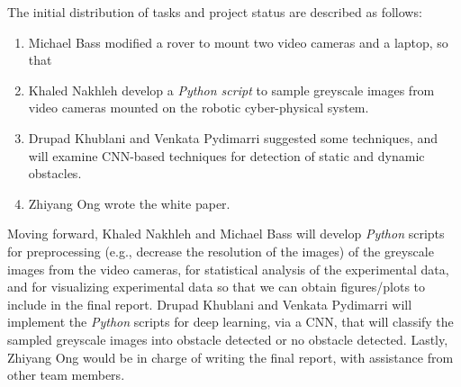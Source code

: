 \documentclass[letter,12pt]{article}
\begin{document}
The initial distribution of tasks and project status are described as follows: \vspace{-0.3cm}
\begin{enumerate} \itemsep -4pt
\item Michael Bass modified a rover to mount two video cameras and a laptop, so that 
\item Khaled Nakhleh develop a {\it Python script} to sample greyscale images from video cameras mounted on the robotic cyber-physical system.
\item Drupad Khublani and Venkata Pydimarri suggested some techniques, and will examine CNN-based techniques for detection of static and dynamic obstacles.
\item Zhiyang Ong wrote the white paper.
\end{enumerate}

Moving forward, Khaled Nakhleh and Michael Bass will develop {\it Python} scripts for preprocessing (e.g., decrease the resolution of the images) of the greyscale images from the video cameras, for statistical analysis of the experimental data, and for visualizing experimental data so that we can obtain figures/plots to include in the final report. Drupad Khublani and Venkata Pydimarri will implement the {\it Python} scripts for deep learning, via a CNN, that will classify the sampled greyscale images into obstacle detected or no obstacle detected. Lastly, Zhiyang Ong would be in charge of writing the final report, with assistance from other team members.
\end{document}
